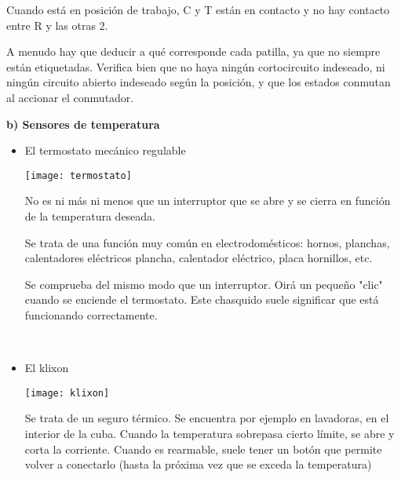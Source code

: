 Cuando está en posición de trabajo, C y T están en contacto y no hay contacto entre R y las otras 2.

A menudo hay que deducir a qué corresponde cada patilla, ya que no siempre están etiquetadas. Verifica bien que no haya ningún cortocircuito indeseado, ni ningún circuito abierto indeseado según la posición, y que los estados conmutan al accionar el conmutador.

\begin{center}
\textbf{b) Sensores de temperatura}
\end{center}

\begin{itemize}

\item El termostato mecánico regulable

\noindent\begin{minipage}[t]{0.45\textwidth}\vspace{0pt}
\texttt{[image: termostato]}
\end{minipage}
\hfill%
\begin{minipage}[t]{0.5\textwidth}\vspace{\fill}
\vspace{\fill}
No es ni más ni menos que un interruptor
que se abre y se cierra en función de la
temperatura deseada.

Se trata de una función muy común en
electrodomésticos: hornos, planchas, calentadores eléctricos
plancha, calentador eléctrico, placa
hornillos, etc.

Se comprueba del mismo modo que un interruptor.
Oirá un pequeño "clic" cuando se enciende el termostato. Este chasquido suele significar que está funcionando correctamente.\\
\vspace{\fill}
\end{minipage}
\vspace{1em}
\\

\item El klixon

\begin{normalize}
\begin{minipage}[h]{\textwidth}\vspace{0pt}
\texttt{[image: klixon]}
\centering
\end{minipage}

Se trata de un seguro térmico. 
Se encuentra por ejemplo en lavadoras, en el interior de la cuba.
Cuando la temperatura sobrepasa cierto límite, se abre y corta la corriente.
Cuando es rearmable, suele tener un botón que permite volver a conectarlo (hasta la próxima vez que se exceda la temperatura)


\end{normalize}
\end{itemize}
